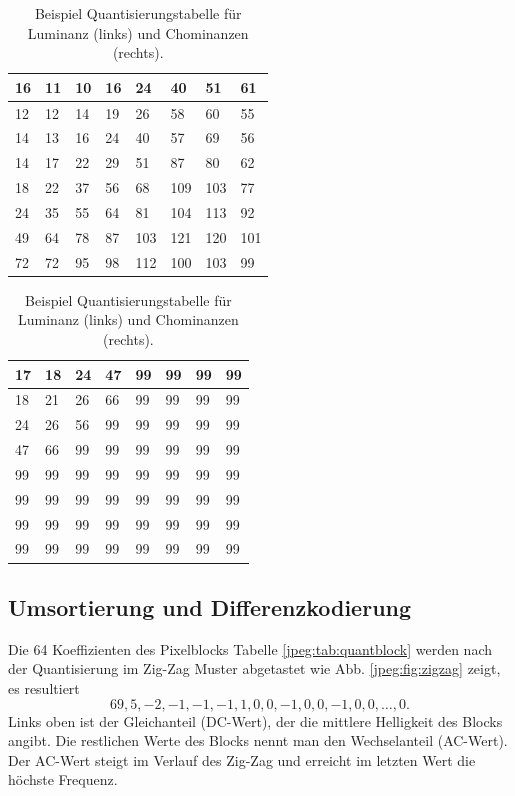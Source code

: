 \begin{table}[b]
    \centering
    \begin{tabularx}{0.47\linewidth}{|X|X|X|X|X|X|X|X|}
        \hline
        16 & 11 & 10 & 16 & 24  & 40 & 51 & 61    \\ \hline
        12 & 12 & 14 & 19 & 26  & 58 & 60 & 55    \\ \hline
        14 & 13 & 16 & 24 & 40  & 57 & 69 & 56    \\ \hline
        14 & 17 & 22 & 29 & 51  & 87 & 80 & 62    \\ \hline
        18 & 22 & 37 & 56 & 68  & 109 & 103 & 77  \\ \hline
        24 & 35 & 55 & 64 & 81  & 104 & 113 & 92  \\ \hline
        49 & 64 & 78 & 87 & 103 & 121 & 120 & 101 \\ \hline
        72 & 72 & 95 & 98 & 112 & 100 & 103 & 99  \\ \hline        
    \end{tabularx}
    \qquad
    \begin{tabularx}{0.47\linewidth}{|X|X|X|X|X|X|X|X|}
        \hline
        17 & 18 & 24 & 47 & 99 & 99 & 99 & 99  \\ \hline
        18 & 21 & 26 & 66 & 99 & 99 & 99 & 99  \\ \hline
        24 & 26 & 56 & 99 & 99 & 99 & 99 & 99  \\ \hline
        47 & 66 & 99 & 99 & 99 & 99 & 99 & 99  \\ \hline
        99 & 99 & 99 & 99 & 99 & 99 & 99 & 99  \\ \hline
        99 & 99 & 99 & 99 & 99 & 99 & 99 & 99  \\ \hline
        99 & 99 & 99 & 99 & 99 & 99 & 99 & 99  \\ \hline
        99 & 99 & 99 & 99 & 99 & 99 & 99 & 99  \\ \hline  	  
    \end{tabularx}
    \caption{Beispiel Quantisierungstabelle für Luminanz (links) und Chominanzen (rechts).
        \label{jpeg:tab:quant}}
\end{table}



\subsection{Umsortierung und Differenzkodierung
\label{jpeg:subsection:umsortierung}}
Die 64 Koeffizienten des Pixelblocks Tabelle \ref{jpeg:tab:quantblock} werden nach der Quantisierung im Zig-Zag \mbox{Muster} abgetastet wie Abb. \ref{jpeg:fig:zigzag} zeigt, es resultiert
\begin{equation}
    69, 5, -2, -1, -1, -1, 1, 0, 0, -1, 0, 0, -1, 0, 0,\dots, 0.
    \label{jpeg:equation:abgetastet}
\end{equation}
Links oben ist der Gleichanteil (DC-Wert), der die mittlere Helligkeit des Blocks angibt.
Die rest\-lichen Werte des Blocks nennt man den Wechselanteil (AC-Wert).
Der AC-Wert steigt im Verlauf des Zig-Zag und erreicht im letzten Wert die höchste Frequenz.

